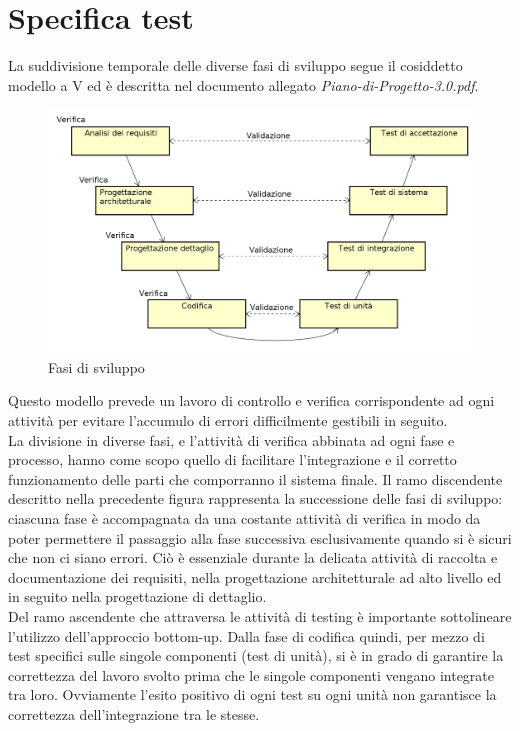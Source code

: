 \documentclass[a4paper,11pt]{article}
\begin{document}
\newpage
\section{Specifica test}
\label{Appendice B} 
La suddivisione temporale delle diverse fasi di sviluppo segue il cosiddetto modello a V ed è descritta nel documento allegato \textit{Piano-di-Progetto-3.0.pdf}.
\begin{figure}[h!]
\centering
\includegraphics[scale=0.4]{../images/vmodel-final4.png}
\caption{Fasi di sviluppo}
\end{figure} 
Questo modello prevede un lavoro di controllo e verifica corrispondente ad ogni attività per evitare l'accumulo di errori difficilmente gestibili in seguito.\\
La divisione in diverse fasi, e l'attività di verifica abbinata ad ogni fase e processo, hanno come scopo quello di facilitare l'integrazione e il corretto funzionamento delle parti che comporranno il sistema finale.
Il ramo discendente descritto nella precedente figura rappresenta la successione delle fasi di sviluppo: ciascuna fase è accompagnata da una costante attività di verifica in modo da poter permettere il passaggio alla fase successiva esclusivamente quando si è sicuri che non ci siano errori. Ciò è essenziale durante la delicata attività di raccolta e documentazione dei requisiti, nella progettazione architetturale ad alto livello ed in seguito nella progettazione di dettaglio.\\ 
Del ramo ascendente che attraversa le attività di testing è importante sottolineare l'utilizzo dell'approccio bottom-up.
Dalla fase di codifica quindi, per mezzo di test specifici sulle singole componenti (test di unità), si è in grado di garantire la correttezza del lavoro svolto prima che le singole componenti vengano integrate tra loro. Ovviamente l'esito positivo di ogni test su ogni unità non garantisce la correttezza dell'integrazione tra le stesse. \\
\end{document}
